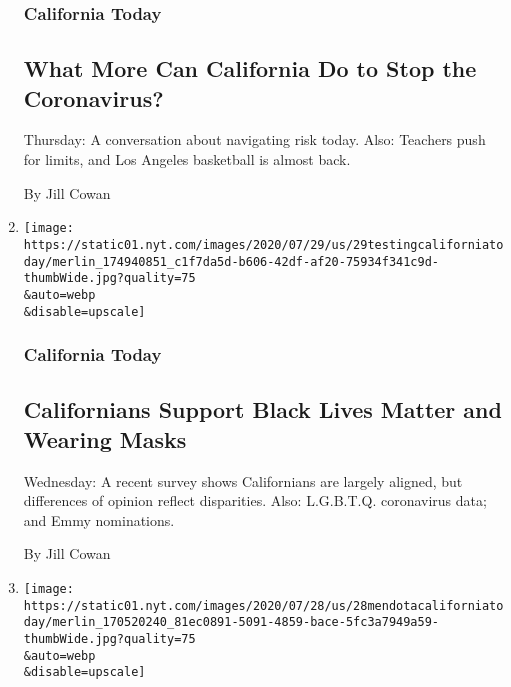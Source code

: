 \begin{enumerate}
  \hypertarget{california-today-1}{%
  \subsubsection{California Today}\label{california-today-1}}

  \hypertarget{what-more-can-california-do-to-stop-the-coronavirus}{%
  \subsection{What More Can California Do to Stop the
  Coronavirus?}\label{what-more-can-california-do-to-stop-the-coronavirus}}

  Thursday: A conversation about navigating risk today. Also: Teachers
  push for limits, and Los Angeles basketball is almost back.

  By Jill Cowan
\item
  \href{/2020/07/29/us/california-coronavirus-demographics.html}{}

  \texttt{[image: https://static01.nyt.com/images/2020/07/29/us/29testingcaliforniatoday/merlin\_174940851\_c1f7da5d-b606-42df-af20-75934f341c9d-thumbWide.jpg?quality=75\\\&auto=webp\\\&disable=upscale]}

  \hypertarget{california-today-2}{%
  \subsubsection{California Today}\label{california-today-2}}

  \hypertarget{californians-support-black-lives-matter-and-wearing-masks}{%
  \subsection{Californians Support Black Lives Matter and Wearing
  Masks}\label{californians-support-black-lives-matter-and-wearing-masks}}

  Wednesday: A recent survey shows Californians are largely aligned, but
  differences of opinion reflect disparities. Also: L.G.B.T.Q.
  coronavirus data; and Emmy nominations.

  By Jill Cowan
\item
  \href{/2020/07/28/us/newsom-coronavirus-valley.html}{}

  \texttt{[image: https://static01.nyt.com/images/2020/07/28/us/28mendotacaliforniatoday/merlin\_170520240\_81ec0891-5091-4859-bace-5fc3a7949a59-thumbWide.jpg?quality=75\\\&auto=webp\\\&disable=upscale]}


\end{enumerate}
